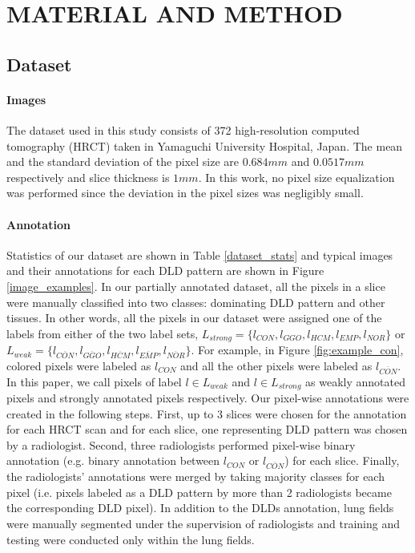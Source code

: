 \documentclass[]{spie}
\begin{document}
\section{MATERIAL AND METHOD}
\subsection{Dataset}
\paragraph{Images}
The dataset used in this study consists of 372 high-resolution computed tomography (HRCT) taken in Yamaguchi University Hospital, Japan.
The mean and the standard deviation of the pixel size are $0.684 mm$ and $0.0517 mm$ respectively and slice thickness is $1 mm$.
In this work, no pixel size equalization was performed since the deviation in the pixel sizes was negligibly small.

\paragraph{Annotation}
Statistics of our dataset are shown in Table \ref{dataset_stats} and typical images and their annotations for each DLD pattern are shown in Figure \ref{image_examples}.
In our partially annotated dataset, all the pixels in a slice were manually classified into two classes: dominating DLD pattern and other tissues.
In other words, all the pixels in our dataset were assigned one of the labels from either of the two label sets, $L_{strong} = \{l_{CON}, l_{GGO}, l_{HCM}, l_{EMP}, l_{NOR}\}$ or $L_{weak} = \{l_{\overline{CON}}, l_{\overline{GGO}}, l_{\overline{HCM}}, l_{\overline{EMP}}, l_{\overline{NOR}}\}$.
For example, in Figure \ref{fig:example_con}, colored pixels were labeled as $l_{CON}$ and all the other pixels were labeled as $l_{\overline{CON}}$.
In this paper, we call pixels of label $l \in L_{weak}$ and $l \in L_{strong}$ as weakly annotated pixels and strongly annotated pixels respectively.
Our pixel-wise annotations were created in the following steps.
First, up to 3 slices were chosen for the annotation for each HRCT scan and for each slice, one representing DLD pattern was chosen by a radiologist.
Second, three radiologists performed pixel-wise binary annotation (e.g. binary annotation between $l_{CON}$ or $l_{\overline{CON}}$) for each slice.
Finally, the radiologists' annotations were merged by taking majority classes for each pixel (i.e. pixels labeled as a DLD pattern by more than 2 radiologists became the corresponding DLD pixel).
In addition to the DLDs annotation, lung fields were manually segmented under the supervision of radiologists and training and testing were conducted only within the lung fields.
\end{document}
